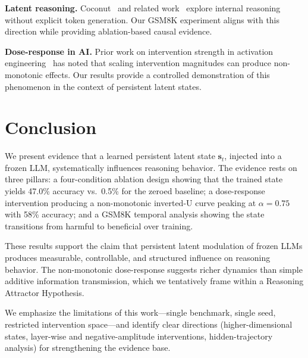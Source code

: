 \documentclass[11pt,a4paper]{article}
\begin{document}
\textbf{Latent reasoning.} Coconut~\cite{hao2024reasoning} and related work~\cite{deng2023chain} explore internal reasoning without explicit token generation. Our GSM8K experiment aligns with this direction while providing ablation-based causal evidence.

\textbf{Dose-response in AI.} Prior work on intervention strength in activation engineering~\cite{turner2023activation} has noted that scaling intervention magnitudes can produce non-monotonic effects. Our results provide a controlled demonstration of this phenomenon in the context of persistent latent states.

\section{Conclusion}

We present evidence that a learned persistent latent state $\mathbf{s}_t$, injected into a frozen LLM, systematically influences reasoning behavior. The evidence rests on three pillars: a four-condition ablation design showing that the trained state yields 47.0\% accuracy vs.\ 0.5\% for the zeroed baseline; a dose-response intervention producing a non-monotonic inverted-U curve peaking at $\alpha = 0.75$ with 58\% accuracy; and a GSM8K temporal analysis showing the state transitions from harmful to beneficial over training.

These results support the claim that persistent latent modulation of frozen LLMs produces measurable, controllable, and structured influence on reasoning behavior. The non-monotonic dose-response suggests richer dynamics than simple additive information transmission, which we tentatively frame within a Reasoning Attractor Hypothesis.

We emphasize the limitations of this work---single benchmark, single seed, restricted intervention space---and identify clear directions (higher-dimensional states, layer-wise and negative-amplitude interventions, hidden-trajectory analysis) for strengthening the evidence base.
\end{document}
